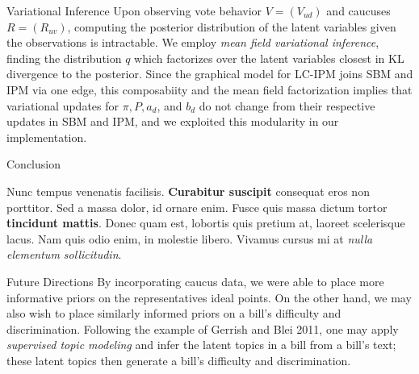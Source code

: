 \documentclass[final]{beamer}
\newlength{\onecolwid}
\begin{document}
\begin{frame}[t]
\begin{columns}[t]
\begin{column}{\onecolwid} %


\begin{block}{Variational Inference}
Upon observing vote behavior $V = (V_{ud})$ and caucuses $R = (R_{uv})$, computing the posterior distribution of the latent variables given the observations is intractable. We employ {\sl mean field variational inference}, finding the distribution $q$ which factorizes over the latent variables closest in KL divergence to the posterior. Since the graphical model for LC-IPM joins SBM and IPM via one edge, this composabiity and the mean field factorization implies that variational updates for $\pi, P, a_d$, and $b_d$ do not change from their respective updates in SBM and IPM, and we exploited this modularity in our implementation. 
\end{block}




\begin{block}{Conclusion}

Nunc tempus venenatis facilisis. \textbf{Curabitur suscipit} consequat eros non porttitor. Sed a massa dolor, id ornare enim. Fusce quis massa dictum tortor \textbf{tincidunt mattis}. Donec quam est, lobortis quis pretium at, laoreet scelerisque lacus. Nam quis odio enim, in molestie libero. Vivamus cursus mi at \textit{nulla elementum sollicitudin}.

\end{block}


\begin{block}{Future Directions}
By incorporating caucus data, we were able to place more informative priors on the representatives ideal points. On the other hand, we may also wish to place similarly informed priors on a bill's difficulty and discrimination. Following the example of Gerrish and Blei 2011, one may apply {\itshape supervised topic modeling} and infer the latent topics in a bill from a bill's text; these latent topics then generate a bill's difficulty and discrimination. 



\end{block}
\end{column}
\end{columns}
\end{frame}
\end{document}
